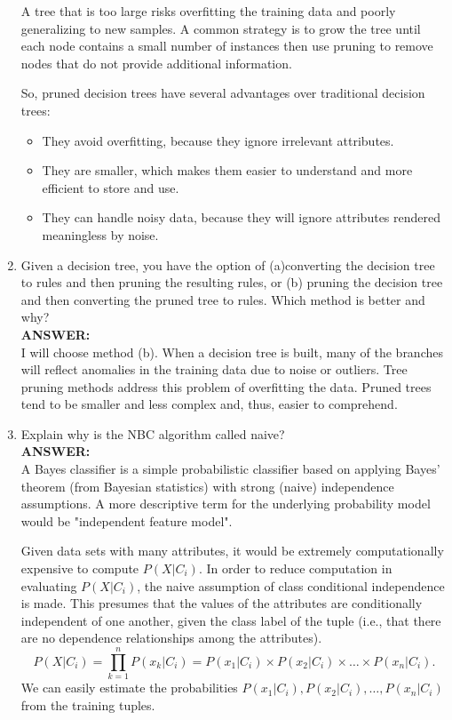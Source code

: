 \documentclass{article}
\begin{document}
\begin{enumerate}
A tree that is too large risks overfitting the training data and
poorly generalizing to new samples. A common strategy is to grow the
tree until each node contains a small number of instances then use
pruning to remove nodes that do not provide additional information.

So, pruned decision trees have several advantages over traditional
decision trees: 
\begin{itemize}
\item They avoid overfitting, because they ignore irrelevant attributes.
\item They are smaller, which makes them easier to understand and more
efficient to store and use. 
\item They can handle noisy data, because they will ignore attributes
rendered meaningless by noise. 
\end{itemize}

\item Given a decision tree, you have the option of (a)converting the
  decision tree to rules and then pruning the resulting rules, or (b)
  pruning the decision tree and then converting the pruned tree to
  rules. Which method is better and why? \\
\textbf{ANSWER:} \\
I will choose method (b).
When a decision tree is built, many of the branches will reflect
anomalies in the training data due to noise or outliers. Tree pruning
methods address this problem of overfitting the data. Pruned trees
tend to be smaller and less complex and, thus, easier to comprehend. 

\item Explain why is the NBC algorithm called naive? \\
\textbf{ANSWER:} \\
A Bayes classifier is a simple probabilistic classifier based on
applying Bayes' theorem (from Bayesian statistics) with strong (naive)
independence assumptions. A more descriptive term for the underlying
probability model would be "independent feature model". 

Given data sets with many attributes, it would be extremely
computationally expensive to compute $P(X|C_i)$. In order to reduce
computation in evaluating $P(X|C_i)$, the naive assumption of class
conditional independence is made. This presumes that the values of the
attributes are conditionally independent of one another, given the
class label of the tuple (i.e., that there are no dependence
relationships among the attributes). 
\begin{equation}
P(X|C_i) = \prod_{k=1}^nP(x_k|C_i) 
= P(x_1|C_i)\times P(x_2|C_i)\times \ldots \times P(x_n|C_i).
\end{equation} 
We can easily estimate the probabilities $P(x_1|C_i), P(x_2|C_i),
\ldots, P(x_n|C_i)$ from the training tuples.


\end{enumerate}
\end{document}
